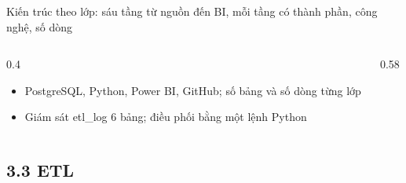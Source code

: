 \begin{frame}{Kiến trúc theo lớp: sáu tầng từ nguồn đến BI, mỗi tầng có thành phần, công nghệ, số dòng}
\begin{columns}[T]\begin{column}{0.4\textwidth}
\begin{itemize}
  \item PostgreSQL, Python, Power BI, GitHub; số bảng và số dòng từng lớp
  \item Giám sát etl\_log 6 bảng; điều phối bằng một lệnh Python
\end{itemize}
\end{column}\begin{column}{0.58\textwidth}
\begin{center}\end{center}
\end{column}\end{columns}

\end{frame}

\subsection{3.3 ETL}


